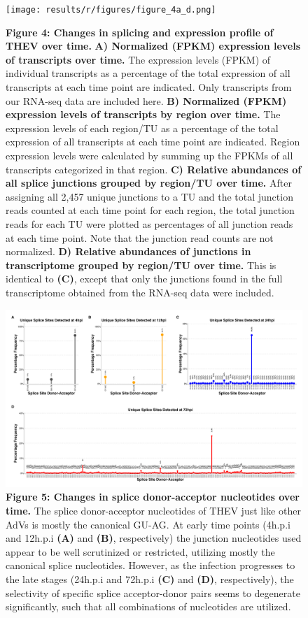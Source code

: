 \documentclass[
]{article}
\begin{document}
\begin{figure}
\centering
\texttt{[image: results/r/figures/figure\_4a\_d.png]}
\caption{\textbf{Figure 4: Changes in splicing and expression profile of
THEV over time.} \textbf{A) Normalized (FPKM) expression levels of
transcripts over time.} The expression levels (FPKM) of individual
transcripts as a percentage of the total expression of all transcripts
at each time point are indicated. Only transcripts from our RNA-seq data
are included here. \textbf{B) Normalized (FPKM) expression levels of
transcripts by region over time.} The expression levels of each
region/TU as a percentage of the total expression of all transcripts at
each time point are indicated. Region expression levels were calculated
by summing up the FPKMs of all transcripts categorized in that region.
\textbf{C) Relative abundances of all splice junctions grouped by
region/TU over time.} After assigning all 2,457 unique junctions to a TU
and the total junction reads counted at each time point for each region,
the total junction reads for each TU were plotted as percentages of all
junction reads at each time point. Note that the junction read counts
are not normalized. \textbf{D) Relative abundances of junctions in
transcriptome grouped by region/TU over time.} This is identical to
\textbf{(C)}, except that only the junctions found in the full
transcriptome obtained from the RNA-seq data were included.}
\end{figure}

\begin{figure}
\centering
\includegraphics{results/r/figures/figure_5a_d.png}
\caption{\textbf{Figure 5: Changes in splice donor-acceptor nucleotides
over time.} The splice donor-acceptor nucleotides of THEV just like
other AdVs is mostly the canonical GU-AG. At early time points (4h.p.i
and 12h.p.i \textbf{(A)} and \textbf{(B)}, respectively) the junction
nucleotides used appear to be well scrutinized or restricted, utilizing
mostly the canonical splice nucleotides. However, as the infection
progresses to the late stages (24h.p.i and 72h.p.i \textbf{(C)} and
\textbf{(D)}, respectively), the selectivity of specific splice
acceptor-donor pairs seems to degenerate significantly, such that all
combinations of nucleotides are utilized.}
\end{figure}
\end{document}
